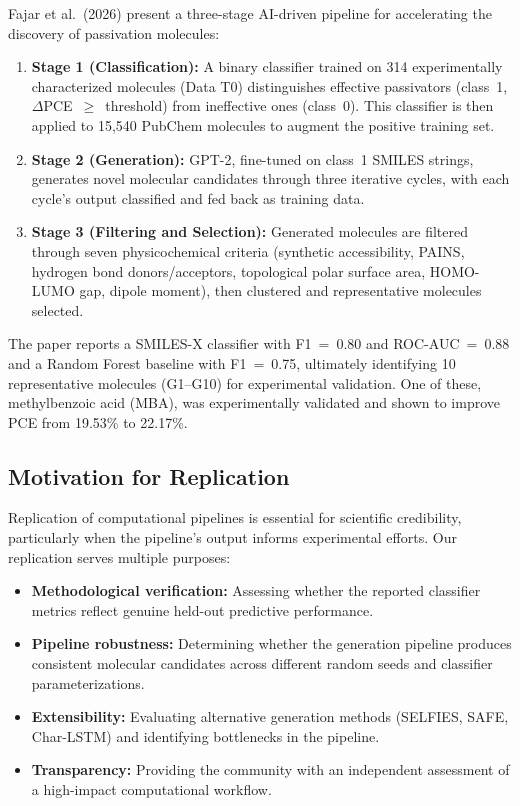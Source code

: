 \documentclass[11pt,a4paper]{article}
\begin{document}
Fajar et al.\ (2026) present a three-stage AI-driven pipeline for accelerating the discovery of passivation molecules:
\begin{enumerate}[nosep]
    \item \textbf{Stage 1 (Classification):} A binary classifier trained on 314 experimentally characterized molecules (Data T0) distinguishes effective passivators (class~1, $\Delta$PCE~$\geq$~threshold) from ineffective ones (class~0). This classifier is then applied to 15,540 PubChem molecules to augment the positive training set.
    \item \textbf{Stage 2 (Generation):} GPT-2, fine-tuned on class~1 SMILES strings, generates novel molecular candidates through three iterative cycles, with each cycle's output classified and fed back as training data.
    \item \textbf{Stage 3 (Filtering and Selection):} Generated molecules are filtered through seven physicochemical criteria (synthetic accessibility, PAINS, hydrogen bond donors/acceptors, topological polar surface area, HOMO-LUMO gap, dipole moment), then clustered and representative molecules selected.
\end{enumerate}

The paper reports a SMILES-X classifier with F1~=~0.80 and ROC-AUC~=~0.88 and a Random Forest baseline with F1~=~0.75, ultimately identifying 10 representative molecules (G1--G10) for experimental validation. One of these, methylbenzoic acid (MBA), was experimentally validated and shown to improve PCE from 19.53\% to 22.17\%.

\subsection{Motivation for Replication}

Replication of computational pipelines is essential for scientific credibility, particularly when the pipeline's output informs experimental efforts. Our replication serves multiple purposes:
\begin{itemize}[nosep]
    \item \textbf{Methodological verification:} Assessing whether the reported classifier metrics reflect genuine held-out predictive performance.
    \item \textbf{Pipeline robustness:} Determining whether the generation pipeline produces consistent molecular candidates across different random seeds and classifier parameterizations.
    \item \textbf{Extensibility:} Evaluating alternative generation methods (SELFIES, SAFE, Char-LSTM) and identifying bottlenecks in the pipeline.
    \item \textbf{Transparency:} Providing the community with an independent assessment of a high-impact computational workflow.
\end{itemize}
\end{document}
